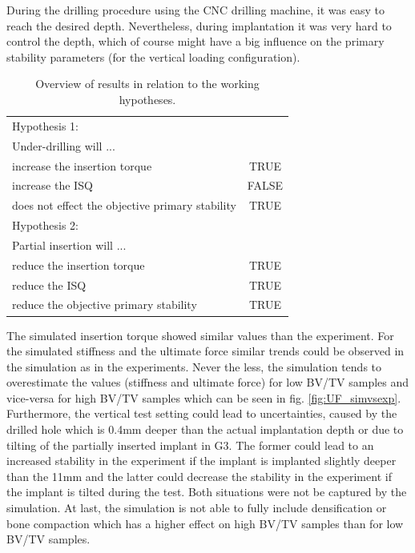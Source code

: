 \documentclass[12pt, a4paper, twoside]{report}
\begin{document}
During the drilling procedure using the CNC drilling machine, it was easy to reach the desired depth. Nevertheless, during implantation it was very hard to control the depth, which of course might have a big influence on the primary stability parameters (for the vertical loading configuration). 

%
\begin{table}[H]
\centering
\begin{tabular}{|l|l|}
	\hline 
	\multicolumn{2}{|l|}{Hypothesis 1:}\\
	\multicolumn{2}{|l|}{Under-drilling will ...} \\
	\hline
	increase the insertion torque & \multicolumn{1}{c|}{TRUE} \\
	\hline
	increase the ISQ & \multicolumn{1}{c|}{FALSE}\\
	\hline
	does not effect the objective primary stability & \multicolumn{1}{c|}{TRUE} \\
	\hline
	\hline 
	\multicolumn{2}{|l|}{Hypothesis 2:}\\
	\multicolumn{2}{|l|}{Partial insertion will ...} \\
	\hline
	reduce the insertion torque & \multicolumn{1}{c|}{TRUE} \\
	\hline
	reduce the ISQ & \multicolumn{1}{c|}{TRUE}\\
	\hline
	reduce the objective primary stability & \multicolumn{1}{c|}{TRUE} \\
	\hline
\end{tabular}
\caption{Overview of results in relation to the working hypotheses.}
\label{tab:LGuf}
\end{table}
%
The simulated insertion torque showed similar values than the experiment. For the simulated stiffness and the ultimate force similar trends could be observed in the simulation as in the experiments. Never the less, the simulation tends to overestimate the values (stiffness and ultimate force) for low BV/TV samples and vice-versa for high BV/TV samples which can be seen in fig. \ref{fig:UF_simvsexp}. Furthermore, the vertical test setting could lead to uncertainties, caused by the drilled hole which is 0.4mm deeper than the actual implantation depth or due to tilting of the partially inserted implant in G3. The former could lead to an increased stability in the experiment if the implant is implanted slightly deeper than the 11mm and the latter could decrease the stability in the experiment if the implant is tilted during the test. Both situations were not be captured by the simulation. At last, the simulation is not able to fully include densification or bone compaction which has a higher effect on high BV/TV samples than for low BV/TV samples.
\end{document}
